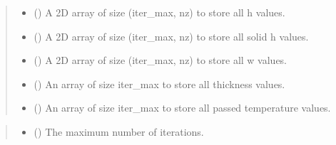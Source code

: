 \documentclass[a4paper,11pt,english,openany]{sphinxmanual}
\begin{document}
\begin{fulllineitems}
\begin{quote}
\begin{description}
\begin{itemize}
\item {} 
\sphinxAtStartPar
{} () \textendash{} A 2D array of size (iter\_max, nz) to store all h values.

\item {} 
\sphinxAtStartPar
{} () \textendash{} A 2D array of size (iter\_max, nz) to store all solid h values.

\item {} 
\sphinxAtStartPar
{} () \textendash{} A 2D array of size (iter\_max, nz) to store all w values.

\item {} 
\sphinxAtStartPar
{} () \textendash{} An array of size iter\_max to store all thickness values.

\item {} 
\sphinxAtStartPar
{} () \textendash{} An array of size iter\_max to store all passed temperature values.

\end{itemize}

\end{description}\end{quote}

\begin{fulllineitems}
\label{\detokenize{api/spyice.parameters.results_params:src.spyice.parameters.results_params.ResultsParams.__init__}}
\pysigstartsignatures
\pysiglinewithargsret
{}
{\sphinxparamcomma {}}
{}
\pysigstopsignatures\begin{quote}\begin{description}
\begin{itemize}
\item {} 
\sphinxAtStartPar
{} () \textendash{} The maximum number of iterations.


\end{itemize}
\end{description}
\end{quote}
\end{fulllineitems}
\end{fulllineitems}
\end{document}
